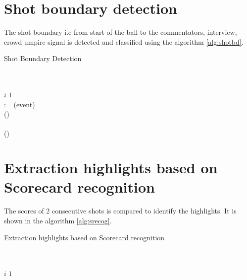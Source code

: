 \section{Shot boundary detection}
The shot boundary i.e from start of the ball to the commentators, interview, crowd umpire signal is detected and classified using the algorithm \ref{alg:shotbd}.
\begin{algorithm}
\caption{Shot Boundary Detection}
\label{alg:shotbd}
\SetAlgoLined
{}
\\
\\
$i$ \leftarrow $1$\\
   { 
  { := \time(event)\\ \AppendCSV() \\}
  {\\ \AppendCSV()\\
  }
  }
\end{algorithm}

\section{Extraction highlights based on Scorecard recognition}
The scores of 2 consecutive shots is compared to identify the highlights. It is shown in the algorithm \ref{alg:srecog}.
\begin{algorithm}
\caption{Extraction highlights based on Scorecard recognition}
\label{alg:srecog}
\SetAlgoLined
{}
\\
\\
$i$ \leftarrow $1$\\
\\
\end{algorithm}

